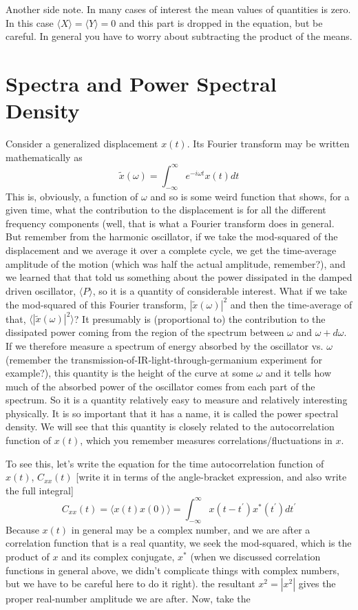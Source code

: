 \documentclass[]{revtex4}
\newcommand{\sm}[1]{{\[#1\]}}
\begin{document}
Another side note.  In many cases of interest the mean values of quantities is zero.
In this case $\langle X\rangle=\langle Y\rangle=0$ and this part is dropped in the equation,
but be careful.  In general you have to worry about subtracting the product of the means.


\section*{Spectra and Power Spectral Density}
Consider a generalized displacement ${x}(t)$.  Its Fourier transform may be written mathematically as
\sm{\tilde{x}(\omega) = \int_{-\infty}^\infty e^{-i\omega t}x(t)dt}
This is, obviously, a function of $\omega$ and so is some weird function that shows, for a given time, what the
contribution to the displacement is for all the different frequency components (well, that is what a Fourier transform does
in general.  But remember from the harmonic oscillator, if we take the mod-squared of the displacement and we average it
over a complete cycle, we get the time-average amplitude
of the motion (which was half the actual amplitude, remember?),
and we learned that that told us something about the power dissipated in the damped driven oscillator, $\langle P\rangle$, so
it is a quantity of considerable interest.  What if we take the mod-squared of this Fourier transform, $|\tilde{x}(\omega)|^2$
and then the time-average of that, $\langle |\tilde{x}(\omega)|^2\rangle$?
It presumably is (proportional to) the contribution to the dissipated power coming from the region of the spectrum between
$\omega$ and $\omega + d\omega$.  If we therefore measure a spectrum of energy absorbed by the oscillator vs. $\omega$
(remember the transmission-of-IR-light-through-germanium experiment for example?), this quantity is the height of the curve
at some $\omega$ and it tells how much of the absorbed power of the oscillator comes from each part of the spectrum.  So
it is a quantity relatively easy to measure and relatively interesting physically.  It is so important that it has a name,
it is called the power spectral density.   We will see that this quantity
is closely related to the autocorrelation function of $x(t)$, which you remember measures correlations/fluctuations
in $x$.

To see this, let's write the equation for the time autocorrelation function of $x(t)$, $C_{xx}(t)$ [write it in terms
of the angle-bracket expression, and also write the full integral]
\sm{C_{xx}(t)=\langle x(t)x(0)\rangle = \int_{-\infty}^\infty x(t-t^\prime)x^*(t^\prime)dt^\prime\label{cxx}}
Because $x(t)$ in general may be a complex number, and we are after a correlation function that is a real quantity,
we seek the mod-squared, which is the product of $x$ and its
complex conjugate, $x^*$ (when we discussed correlation functions in general above, we didn't complicate things
with complex numbers, but we have to be careful here to do it right).  the resultant $x^2=|x^2|$ gives the proper
real-number amplitude we are after. Now, take the
\end{document}
